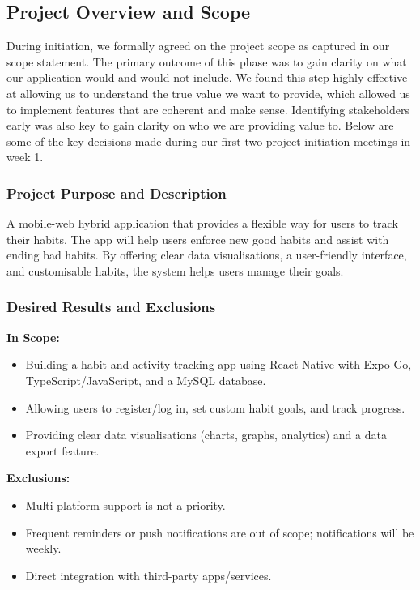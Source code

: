\subsection{Project Overview and Scope}
During initiation, we formally agreed on the project scope as captured in our scope statement. The primary outcome of this phase was to gain clarity on what our application would and would not include. We found this step highly effective at allowing us to understand the true value we want to provide, which allowed us to implement features that are coherent and make sense. Identifying stakeholders early was also key to gain clarity on who we are providing value to. Below are some of the key decisions made during our first two project initiation meetings in week 1.

\subsubsection{Project Purpose and Description}
A mobile-web hybrid application that provides a flexible way for users to track their habits. The app will help users enforce new good habits and assist with ending bad habits. By offering clear data visualisations, a user-friendly interface, and customisable habits, the system helps users manage their goals.

\subsubsection{Desired Results and Exclusions}
\textbf{In Scope:}
\begin{itemize}
    \item Building a habit and activity tracking app using React Native with Expo Go, TypeScript/JavaScript, and a MySQL database.
    \item Allowing users to register/log in, set custom habit goals, and track progress.
    \item Providing clear data visualisations (charts, graphs, analytics) and a data export feature.
\end{itemize}

\textbf{Exclusions:}
\begin{itemize}
    \item Multi-platform support is not a priority.
    \item Frequent reminders or push notifications are out of scope; notifications will be weekly.
    \item Direct integration with third-party apps/services.
\end{itemize}

